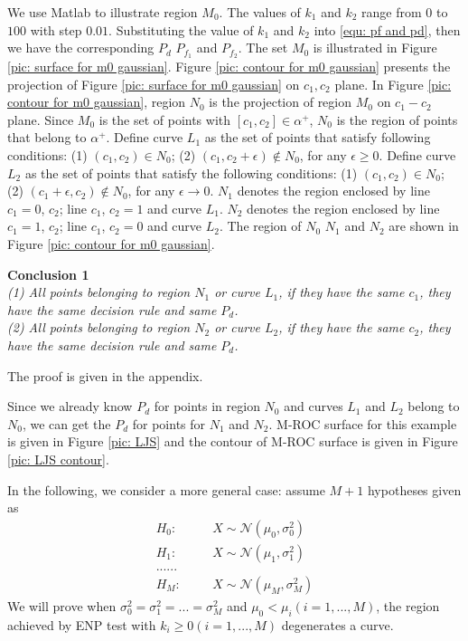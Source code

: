 \documentclass[12pt,journal,a4paper,twoside,doublecolumn]{IEEEtran}
\begin{document}
\begin{spacing}{1.0}
We use Matlab to illustrate region $M_0$. The values of $k_1$ and $k_2$ range from $0$ to $100$ with step $0.01$. Substituting the value of $k_1$ and $k_2$ into \eqref{equ: pf and pd}, then we have the corresponding $P_d$ $P_{f_1}$ and $P_{f_2}$.  The set $M_0$ is illustrated in Figure \ref{pic: surface for m0 gaussian}. Figure \ref{pic: contour for m0 gaussian} presents the projection of Figure \ref{pic: surface for m0 gaussian} on $c_1, c_2$ plane.
In Figure \ref{pic: contour for m0 gaussian}, region $N_0$ is the projection of region $M_0$ on $c_1 - c_2$ plane. Since $M_0$ is the set of points with $[c_1, c_2] \in \alpha^+$, $N_0$ is the region of points that belong to $\alpha^+$.
Define curve $L_1$ as the set of points that satisfy following conditions: (1) $(c_1, c_2) \in N_0$; (2) $(c_1, c_2+\epsilon) \notin N_0$, for any $\epsilon \geq 0$. Define curve $L_2$ as the set of points that satisfy the following conditions: (1) $(c_1, c_2) \in N_0$; (2) $(c_1 + \epsilon, c_2) \notin N_0$, for any $\epsilon \rightarrow 0$.
$N_1$ denotes the region enclosed by line $c_1 = 0$, $c_2$; line $c_1$, $c_2 = 1$ and curve $L_1$.
$N_2$ denotes the region enclosed by line $c_1 = 1$, $c_2$; line $c_1$, $c_2 = 0$ and curve $L_2$.
The region of $N_0$ $N_1$ and $N_2$ are shown in Figure \ref{pic: contour for m0 gaussian}.

\textbf{Conclusion 1}
\textit{\\(1) All points belonging to region $N_1$ or curve $L_1$, if they have the same $c_1$, they have the same decision rule and same $P_d$.
\\(2) All points belonging to region $N_2$ or curve $L_2$, if they have the same $c_2$, they have the same decision rule and same $P_d$.
}

The proof is given in the appendix.

Since we already know $P_d$ for points in region $N_0$ and curves $L_1$ and $L_2$ belong to $N_0$, we can get the $P_d$ for points for $N_1$ and $N_2$. M-ROC surface for this example is given in Figure  \ref{pic: LJS} and the contour of M-ROC surface is given in Figure \ref{pic: LJS contour}.

In the following, we consider a more general case: assume $M+1$ hypotheses given as
\begin{equation}
\label{equ: m+1 Gaussian Hypo}
\begin{split}
H_0:\;\;\;\;\;\;&X\sim \mathcal{N}(\mu_0, \sigma_0^2)\\
H_1:\;\;\;\;\;\;&X\sim \mathcal{N}(\mu_1, \sigma_1^2)\\
  ......\\
H_M:\;\;\;\;\;\;&X\sim \mathcal{N}(\mu_M, \sigma_M^2)
\end{split}
\end{equation}
We will prove when $\sigma_0^2 = \sigma_1^2 = ... = \sigma_M^2$ and $\mu_0 < \mu_i (i = 1, ..., M)$, the region achieved by ENP test with $k_i \geq 0 (i = 1, ..., M)$ degenerates a curve.


\end{spacing}
\end{document}
